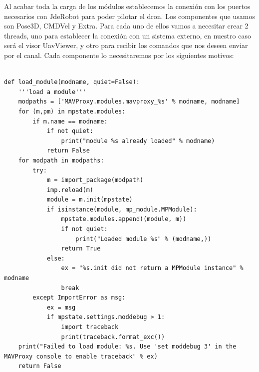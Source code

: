 Al acabar toda la carga de los módulos establecemos la conexión con los puertos necesarios con JdeRobot para poder pilotar el dron. Los componentes que usamos son Pose3D, CMDVel y Extra. Para cada uno de ellos vamos a necesitar crear 2 threads, uno para establecer la conexión con un sistema externo, en nuestro caso será el visor UavViewer, y otro para recibir los comandos que nos deseen enviar por el canal. Cada componente lo necesitaremos por los siguientes motivos:

{\scriptsize
\begin{verbatim}

def load_module(modname, quiet=False):
    '''load a module'''
    modpaths = ['MAVProxy.modules.mavproxy_%s' % modname, modname]
    for (m,pm) in mpstate.modules:
        if m.name == modname:
            if not quiet:
                print("module %s already loaded" % modname)
            return False
    for modpath in modpaths:
        try:
            m = import_package(modpath)
            imp.reload(m)
            module = m.init(mpstate)
            if isinstance(module, mp_module.MPModule):
                mpstate.modules.append((module, m))
                if not quiet:
                    print("Loaded module %s" % (modname,))
                return True
            else:
                ex = "%s.init did not return a MPModule instance" % modname
                break
        except ImportError as msg:
            ex = msg
            if mpstate.settings.moddebug > 1:
                import traceback
                print(traceback.format_exc())
    print("Failed to load module: %s. Use 'set moddebug 3' in the MAVProxy console to enable traceback" % ex)
    return False
\end{verbatim}}

